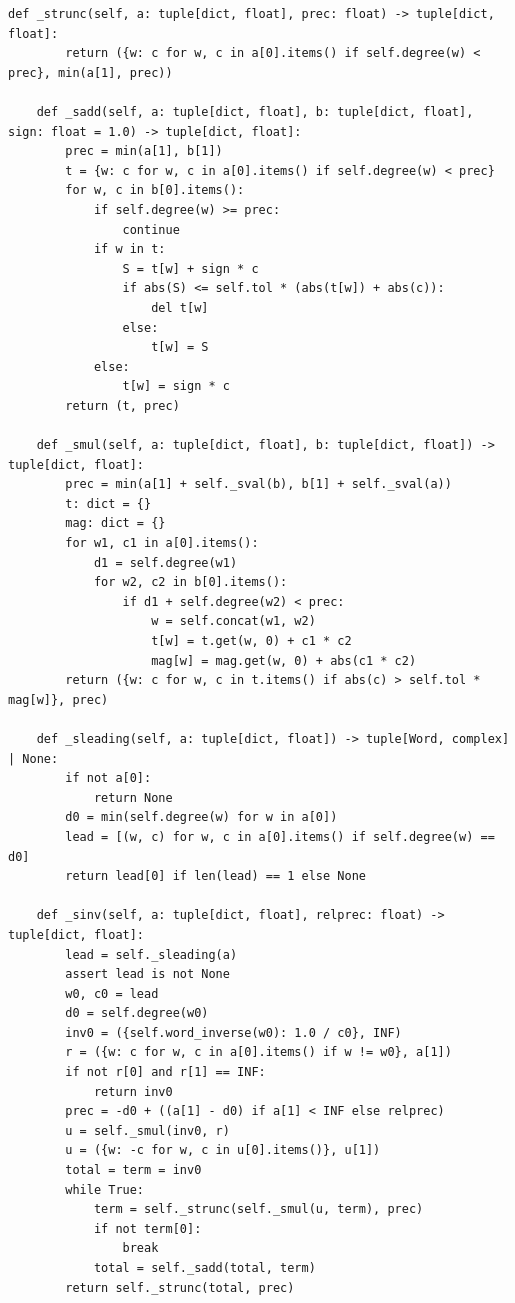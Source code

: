 \documentclass[12pt, a4paper]{report}
\theoremstyle{plain}
\theoremstyle{definition}
\theoremstyle{remark}
\theoremstyle{plain}
\begin{document}
\begin{lstlisting}[style=dsqcode]
    def _strunc(self, a: tuple[dict, float], prec: float) -> tuple[dict, float]:
        return ({w: c for w, c in a[0].items() if self.degree(w) < prec}, min(a[1], prec))

    def _sadd(self, a: tuple[dict, float], b: tuple[dict, float], sign: float = 1.0) -> tuple[dict, float]:
        prec = min(a[1], b[1])
        t = {w: c for w, c in a[0].items() if self.degree(w) < prec}
        for w, c in b[0].items():
            if self.degree(w) >= prec:
                continue
            if w in t:
                S = t[w] + sign * c
                if abs(S) <= self.tol * (abs(t[w]) + abs(c)):
                    del t[w]
                else:
                    t[w] = S
            else:
                t[w] = sign * c
        return (t, prec)

    def _smul(self, a: tuple[dict, float], b: tuple[dict, float]) -> tuple[dict, float]:
        prec = min(a[1] + self._sval(b), b[1] + self._sval(a))
        t: dict = {}
        mag: dict = {}
        for w1, c1 in a[0].items():
            d1 = self.degree(w1)
            for w2, c2 in b[0].items():
                if d1 + self.degree(w2) < prec:
                    w = self.concat(w1, w2)
                    t[w] = t.get(w, 0) + c1 * c2
                    mag[w] = mag.get(w, 0) + abs(c1 * c2)
        return ({w: c for w, c in t.items() if abs(c) > self.tol * mag[w]}, prec)

    def _sleading(self, a: tuple[dict, float]) -> tuple[Word, complex] | None:
        if not a[0]:
            return None
        d0 = min(self.degree(w) for w in a[0])
        lead = [(w, c) for w, c in a[0].items() if self.degree(w) == d0]
        return lead[0] if len(lead) == 1 else None

    def _sinv(self, a: tuple[dict, float], relprec: float) -> tuple[dict, float]:
        lead = self._sleading(a)
        assert lead is not None
        w0, c0 = lead
        d0 = self.degree(w0)
        inv0 = ({self.word_inverse(w0): 1.0 / c0}, INF)
        r = ({w: c for w, c in a[0].items() if w != w0}, a[1])
        if not r[0] and r[1] == INF:
            return inv0
        prec = -d0 + ((a[1] - d0) if a[1] < INF else relprec)
        u = self._smul(inv0, r)
        u = ({w: -c for w, c in u[0].items()}, u[1])
        total = term = inv0
        while True:
            term = self._strunc(self._smul(u, term), prec)
            if not term[0]:
                break
            total = self._sadd(total, term)
        return self._strunc(total, prec)


\end{lstlisting}
\end{document}
